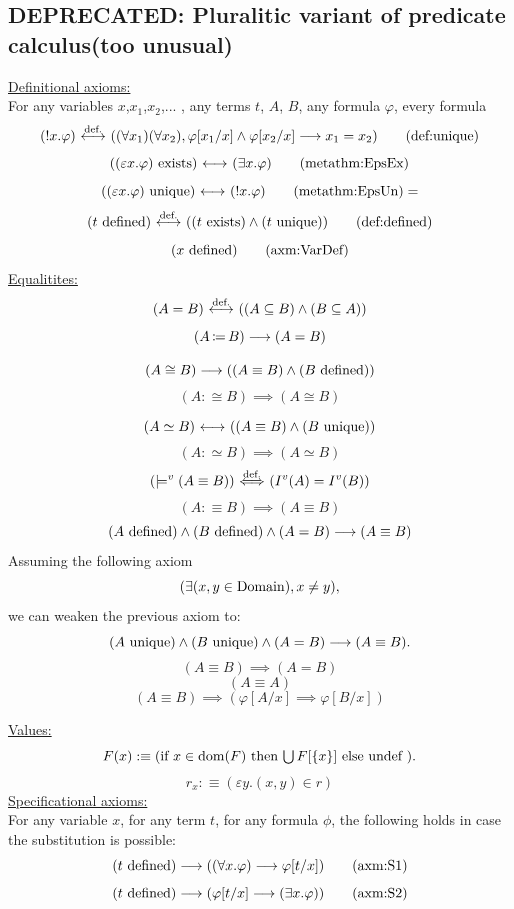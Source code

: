\fi
\iffalse
\subsection{DEPRECATED: Pluralitic variant of predicate calculus(too unusual)}
\underline{Definitional axioms:}\\
For any variables $x$,$x_1$,$x_2$,... , any terms $t$, $A$, $B$, any formula $\varphi$, every formula
\[
(!x.\varphi)
\iffdef
((\forall x_1)(\forall x_2),\varphi[x_1/x]\land\varphi[x_2/x]\implies x_1=x_2)
\labeltag{def:unique}
\]
\[
((\varepsilon x.\varphi) \lexists)
\iff
(\exists x.\varphi)
\labeltag{metathm:EpsEx}
\]
\[
((\varepsilon x.\varphi) \lunique)
\iff
(!x.\varphi)
\labeltagd{metathm}{EpsUn}=
\]
\[
(t\ldefined)
\iffdef
(
(t\lexists)
\land
(t\lunique)
)
\labeltagd{def}{defined}
\]
\[
(x\ldefined)
\labeltagd{axm}{VarDef}
\]
\underline{Equalitites:}
\[
(A=B)\ {\stackrel{{\textrm{def.}}}{\longleftrightarrow}}\  ((A\subseteq B)\land (B\subseteq A))
\]
\[
(A\,{\coloneqq}\, B)\longrightarrow(A=B)
\]

\[
(A\cong B)\longrightarrow ((A\equiv B)\land(B\mathrm{\ defined}))
\]
\[
(A:\cong B)\implies(A\cong B)
\]

\[
(A\simeq B){\ \longleftrightarrow\ } ((A\equiv B)\land(B\mathrm{\ unique}))
\]
\[
(A:\simeq B)\implies(A\simeq B)
\]
\[
(\models^v (A\equiv B))\ {\stackrel{{\textrm{def.}}}{\Longleftrightarrow}}\ (I^v(A)=I^v(B))
\]
\[
(A:\equiv B)\implies(A\equiv B)
\]
\[
(A\mathrm{\ defined})\land(B\mathrm{\ defined})\land(A=B)\longrightarrow(A\equiv B)
\]
Assuming the following axiom
\[
(\exists(x,y\in\mathrm{Domain}),x\neq y),
\]
we can weaken the previous axiom to:
\[
(A\mathrm{\ unique})\land(B\mathrm{\ unique})\land(A=B)\longrightarrow(A\equiv B).
\]
\[
(A\equiv B)\implies(A=B)
\]
\[
(A\equiv A)
\]
\[
(A\equiv B)\implies(\varphi[A/x]\implies\varphi[B/x])
\]

\underline{Values:}
\[
F(x):\equiv (\mbox{if $x\in\mathrm{dom}(F)$ then $\bigcup F[\{x\}]$ else undef }).
\]
\[
r_x:\equiv (\varepsilon y. (x,y)\in r)
\]
\underline{Specificational axioms:}\\
For any variable $x$, for any term $t$, for any formula $\phi$, the following holds in case the substitution is possible:
\[
(t\ldefined)\implies ((\forall x. \phi) \implies \phi[t/x])
\labeltagd{axm}{S1}
\]
\[
(t\ldefined) \implies (\phi[t/x] \implies (\exists x. \phi))
\labeltagd{axm}{S2}
\]
